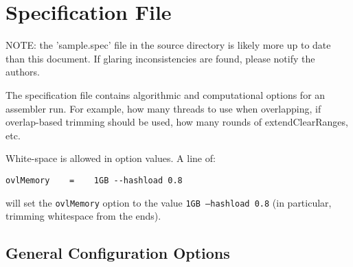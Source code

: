 \documentclass[twoside,11pt]{article}
\begin{document}
\section{Specification File}

NOTE: the 'sample.spec' file in the source directory is likely more up
to date than this document.  If glaring inconsistencies are found,
please notify the authors.

The specification file contains algorithmic and computational options
for an assembler run.  For example, how many threads to use when
overlapping, if overlap-based trimming should be used, how many rounds
of extendClearRanges, etc.

White-space is allowed in option values.  A line of:
\begin{verbatim}
ovlMemory    =    1GB --hashload 0.8
\end{verbatim}
will set the {\tt ovlMemory} option to the value {\tt 1GB --hashload
0.8} (in particular, trimming whitespace from the ends).

\subsection{General Configuration Options}
\end{document}
